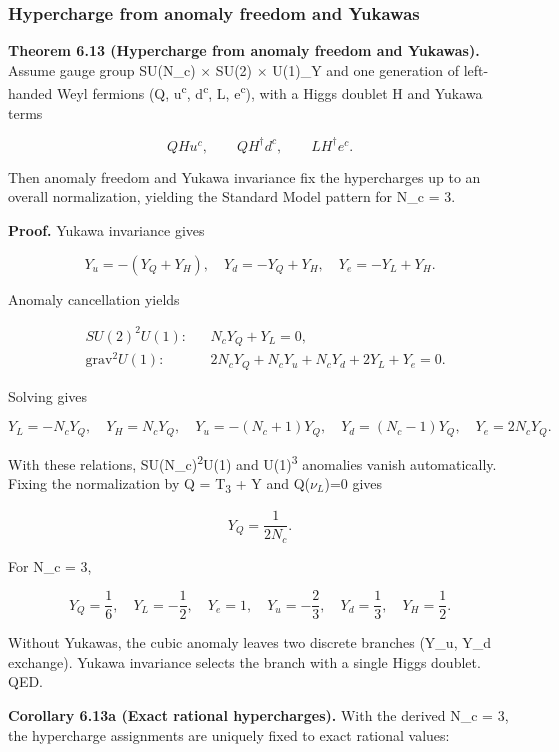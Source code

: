 \documentclass[11pt,a4paper]{article}
\theoremstyle{remark}
\begin{document}
\subsubsection{Hypercharge from anomaly freedom and Yukawas}\label{hypercharge-from-anomaly-freedom-and-yukawas}

\textbf{Theorem 6.13 (Hypercharge from anomaly freedom and Yukawas).} Assume gauge
group SU(N\_c) \ensuremath{\times} SU(2) \ensuremath{\times} U(1)\_Y and one generation of left-handed Weyl
fermions (Q, u\textsuperscript{c}, d\textsuperscript{c}, L, e\textsuperscript{c}), with a Higgs doublet H and Yukawa terms

\[
Q H u^c,\qquad Q H^\dagger d^c,\qquad L H^\dagger e^c.
\]

Then anomaly freedom and Yukawa invariance fix the hypercharges up to an
overall normalization, yielding the Standard Model pattern for N\_c = 3.

\textbf{Proof.} Yukawa invariance gives

\[
Y_u = -(Y_Q + Y_H),\quad
Y_d = -Y_Q + Y_H,\quad
Y_e = -Y_L + Y_H.
\]

Anomaly cancellation yields

\[
\begin{aligned}
&SU(2)^2 U(1): && N_c Y_Q + Y_L = 0,\\
&\mathrm{grav}^2 U(1): && 2 N_c Y_Q + N_c Y_u + N_c Y_d + 2 Y_L + Y_e = 0.
\end{aligned}
\]

Solving gives

\[
Y_L = -N_c Y_Q,\quad
Y_H = N_c Y_Q,\quad
Y_u = -(N_c + 1) Y_Q,\quad
Y_d = (N_c - 1) Y_Q,\quad
Y_e = 2 N_c Y_Q.
\]

With these relations, SU(N\_c)\textsuperscript{2}U(1) and U(1)\textsuperscript{3} anomalies vanish
automatically. Fixing the normalization by Q = T\textsubscript{3} + Y and Q($\nu_L$)=0 gives

\[
Y_Q = \frac{1}{2 N_c}.
\]

For N\_c = 3,

\[
Y_Q = \frac{1}{6},\quad Y_L = -\frac{1}{2},\quad Y_e = 1,\quad
Y_u = -\frac{2}{3},\quad Y_d = \frac{1}{3},\quad Y_H = \frac{1}{2}.
\]

Without Yukawas, the cubic anomaly leaves two discrete branches (Y\_u, Y\_d
exchange). Yukawa invariance selects the branch with a single Higgs doublet.
QED.

\textbf{Corollary 6.13a (Exact rational hypercharges).} With the derived N\_c = 3,
the hypercharge assignments are uniquely fixed to exact rational values:
\end{document}

